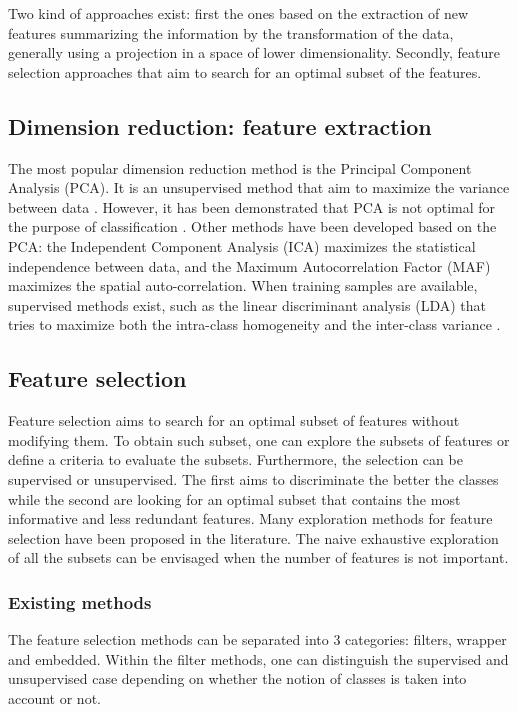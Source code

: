 Two kind of approaches exist: first the ones based on the extraction of new features summarizing the information by the transformation of the data, generally using a projection in a space of lower dimensionality. Secondly, feature selection approaches that aim to search for an optimal subset of the features.

\subsection{Dimension reduction: feature extraction}
The most popular dimension reduction method is the Principal Component Analysis (PCA). It is an unsupervised method that aim to maximize the variance between data \citep{jolliffe2011principal}. However, it has been demonstrated that PCA is not optimal for the purpose of classification \citep{cheriyadat2003principal}. Other methods have been developed based on the PCA: the Independent Component Analysis (ICA) \citep{jutten1991blind} maximizes the statistical independence between data, and the Maximum Autocorrelation Factor (MAF) \citep{larsen2002decomposition} maximizes the spatial auto-correlation. When training samples are available, supervised methods exist, such as the linear discriminant analysis (LDA) that tries to maximize both the intra-class homogeneity and the inter-class variance \citep{fisher1936use, lebart1997multidimensional}.

\subsection{Feature selection}
Feature selection aims to search for an optimal subset of features without modifying them. To obtain such subset, one can explore the subsets of features or define a criteria to evaluate the subsets. Furthermore, the selection can be supervised or unsupervised. The first aims to discriminate the better the classes while the second are looking for an optimal subset that contains the most informative and less redundant features.
Many exploration methods for feature selection have been proposed in the literature. The naive exhaustive exploration of all the subsets can be envisaged when the number of features is not important. 

\subsubsection{Existing methods}
The feature selection methods can be separated into 3 categories: filters, wrapper and embedded. Within the filter methods, one can distinguish the supervised and unsupervised case depending on whether the notion of classes is taken into account or not.

